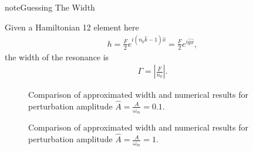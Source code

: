 \documentclass[letterpaper,12pt,english]{sphinxmanual}
\begin{document}
\begin{sphinxadmonition}{note}{Guessing The Width}

Given a Hamiltonian 12 element here
\begin{equation*}
\begin{split}h = \frac{F}{2} e^{i(n_0 \hat k - 1) \hat x} = \frac{F}{2} e^{i \hat g \hat x},\end{split}
\end{equation*}
the width of the resonance is
\label{\detokenize{matter-stimulated/single-frequency:single-frequency-equation-eqn-single-frequency-width-guessing}}\label{\detokenize{matter-stimulated/single-frequency:equation-eqn-single-frequency-width-guessing}}\begin{equation}\label{equation:matter-stimulated/single-frequency:eqn-single-frequency-width-guessing}
\begin{split}\Gamma = \left\lvert \frac{F}{n_0} \right\rvert.\end{split}
\end{equation}\end{sphinxadmonition}
\begin{figure}[htbp]
\centering
\capstart

\noindent{}
\caption{Comparison of approximated width and numerical results for perturbation amplitude \(\hat A = \frac{A}{\omega_m} = 0.1\).}\label{\detokenize{matter-stimulated/single-frequency:id8}}\end{figure}
\begin{figure}[htbp]
\centering
\capstart

\noindent{}
\caption{Comparison of approximated width and numerical results for perturbation amplitude \(\hat A = \frac{A}{\omega_m} = 1\).}\label{\detokenize{matter-stimulated/single-frequency:id9}}\end{figure}
\end{document}
